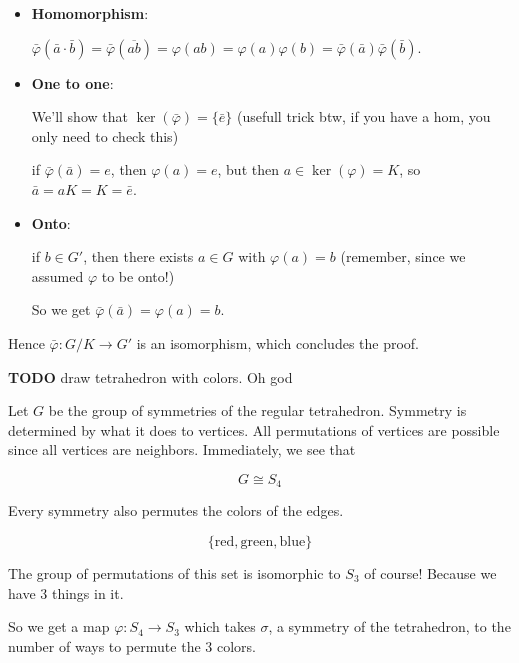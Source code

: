 \documentclass[12pt]{article}
\newcommand{\TODO}{\color{red}\textbf{TODO}\color{black}}
\begin{document}
\begin{itemize}
  \item {\bf Homomorphism}:

    $\bar \varphi(\bar a \cdot \bar b) = \bar \varphi(\overline{ab}) =
    \varphi(ab) = \varphi(a) \varphi(b) = \bar \varphi(\bar a) \bar
    \varphi(\bar b)$.

  \item {\bf One to one}:

    We'll show that $\ker(\bar \varphi) = \{ \bar e \}$ (usefull trick btw, if you have a hom, you only need to check this)

    if $\bar \varphi(\bar a) = e$, then $\varphi(a) = e$, but then $a \in
    \ker(\varphi) = K$, so $\bar a = aK = K = \bar e$.

  \item {\bf Onto}:

    if $b \in G'$, then there exists $a \in G$ with $\varphi(a) = b$
    (remember, since we assumed $\varphi$ to be onto!)

    So we get $\bar \varphi(\bar a) = \varphi(a) = b$.
\end{itemize}

Hence $\bar \varphi: G / K \to G'$ is an isomorphism, which concludes the
proof.



\TODO{} draw tetrahedron with colors. Oh god

Let $G$ be the group of symmetries of the regular tetrahedron. Symmetry is
determined by what it does to vertices. All permutations of vertices are
possible since all vertices are neighbors. Immediately, we see that

\[
  G \cong S_4
\]

Every symmetry also permutes the colors of the edges.

\[
  \{\text{red}, \text{green}, \text{blue}\}
\]

The group of permutations of this set is isomorphic to $S_3$ of course! Because
we have 3 things in it.

So we get a map $\varphi: S_4 \to S_3$ which takes $\sigma$, a symmetry of the
tetrahedron, to the number of ways to permute the $3$ colors.
\end{document}
